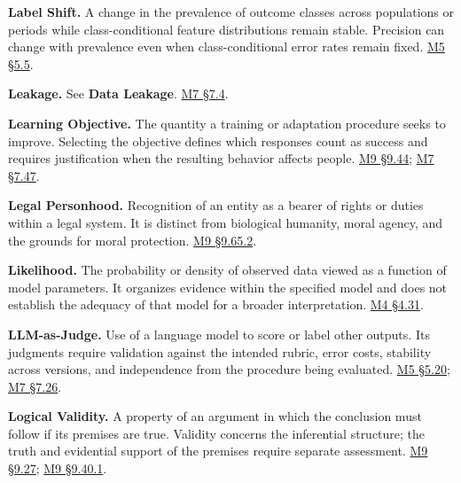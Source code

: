 \noindent\textbf{Label Shift.} A change in the prevalence of outcome classes
across populations or periods while class-conditional feature
distributions remain stable. Precision can change with prevalence even
when class-conditional error rates remain fixed.
\href{Marketing_Analytics_Lecture_Notes.pdf\#M05-case-study-a-complaint-detector-under-changing-prevalence}{M5
§5.5}.

\noindent\textbf{Leakage.} See \textbf{Data Leakage}.
\href{Marketing_Analytics_Lecture_Notes.pdf\#M07-validation-cross-validation-and-leakage}{M7
§7.4}.

\noindent\textbf{Learning Objective.} The quantity a training or adaptation
procedure seeks to improve. Selecting the objective defines which
responses count as success and requires justification when the resulting
behavior affects people.
\hyperref[M09-personalization-and-the-learners-authority]{M9
§9.44};
\href{Marketing_Analytics_Lecture_Notes.pdf\#M07-a-predictable-response-and-a-defensible-objective}{M7
§7.47}.

\noindent\textbf{Legal Personhood.} Recognition of an entity as a bearer of
rights or duties within a legal system. It is distinct from biological
humanity, moral agency, and the grounds for moral protection.
\hyperref[M09-corporate-duties-and-human-protections]{M9
§9.65.2}.

\noindent\textbf{Likelihood.} The probability or density of observed data viewed
as a function of model parameters. It organizes evidence within the
specified model and does not establish the adequacy of that model for a
broader interpretation.
\href{Marketing_Analytics_Lecture_Notes.pdf\#M04-released-retail-data-integrated-heterogeneity-and-competing-explanations}{M4
§4.31}.

\noindent\textbf{LLM-as-Judge.} Use of a language model to score or label other
outputs. Its judgments require validation against the intended rubric,
error costs, stability across versions, and independence from the
procedure being evaluated.
\href{Marketing_Analytics_Lecture_Notes.pdf\#M05-evaluate-the-grader-and-justify-the-rubric}{M5
§5.20};
\href{Marketing_Analytics_Lecture_Notes.pdf\#M07-evaluation-coverage-and-the-costs-of-grading-errors}{M7
§7.26}.

\noindent\textbf{Logical Validity.} A property of an argument in which the
conclusion must follow if its premises are true. Validity concerns the
inferential structure; the truth and evidential support of the premises
require separate assessment.
\hyperref[M09-logical-assessment-of-an-empirical-argument]{M9
§9.27};
\hyperref[M09-validity-soundness-and-evidential-support]{M9
§9.40.1}.

